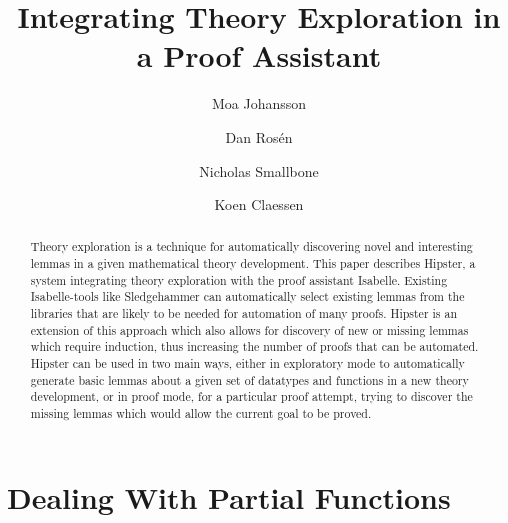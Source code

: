 \documentclass{llncs}
\begin{document}
\title{Integrating Theory Exploration in a Proof Assistant}

\author{Moa Johansson \and Dan Ros\'en \and Nicholas Smallbone \and Koen Claessen}


\maketitle

\begin{abstract}
Theory exploration is a technique for automatically discovering novel and interesting lemmas in a given mathematical theory development. This paper describes Hipster, a system integrating theory exploration with the proof assistant Isabelle.
Existing Isabelle-tools like Sledgehammer can automatically select existing lemmas from the libraries that are likely to be needed for automation of many proofs. Hipster is an extension of this approach which also allows for discovery of new or missing lemmas which require induction, thus increasing the number of proofs that can be automated.
Hipster can be used in two main ways, either in exploratory mode to automatically generate basic lemmas about a given set of datatypes and functions in a new theory development, or in proof mode, for a particular proof attempt, trying to discover the missing lemmas which would allow the current goal to be proved. 

\end{abstract}







\section{Dealing With Partial Functions}
\label{sec:partial}









\end{document}
